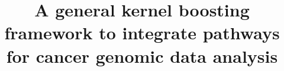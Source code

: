 \documentclass[a4paper,12pt]{article}
\begin{document}
	\title{A general kernel boosting framework to integrate pathways for cancer genomic data analysis}
	\maketitle
\end{document}
